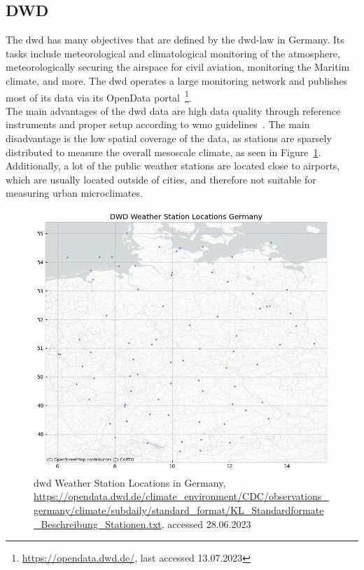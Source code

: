 \subsection{DWD}

The \gls{dwd} has many objectives that are defined by the \gls{dwd}-law in Germany. Its tasks include meteorological and climatological monitoring of the atmosphere, meteorologically securing the airspace for civil aviation, monitoring the Maritim climate, and more. The \gls{dwd} operates a large monitoring network and publishes most of its data via its OpenData portal~\footnote{\url{https://opendata.dwd.de/}, last accessed 13.07.2023}.\\
The main advantages of the \gls{dwd} data are high data quality through reference instruments and proper setup according to \gls{wmo} guidelines~\cite{wmo2018guide}. The main disadvantage is the low spatial coverage of the data, as stations are sparsely distributed to measure the overall mesoscale climate, as seen in Figure~\ref{fig:dwd sensor locations germany}. Additionally, a lot of the public weather stations are located close to airports, which are usually located outside of cities, and therefore not suitable for measuring urban microclimates.

\begin{figure}[ht]
    \centering
    \includegraphics[width=1\textwidth]{images/dwd_weather_station_locations_germany.png}
    \caption{\gls{dwd} Weather Station Locations in Germany, \url{https://opendata.dwd.de/climate_environment/CDC/observations_germany/climate/subdaily/standard_format/KL_Standardformate_Beschreibung_Stationen.txt}, accessed 28.06.2023}
    \label{fig:dwd sensor locations germany}
\end{figure}

